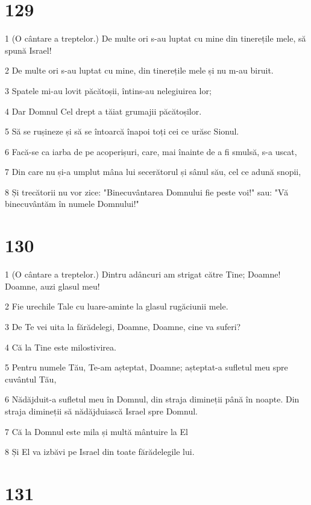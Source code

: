 \chapter{129}

\par 1 (O cântare a treptelor.) De multe ori s-au luptat cu mine din tinerețile mele, să spună Israel!
\par 2 De multe ori s-au luptat cu mine, din tinerețile mele și nu m-au biruit.
\par 3 Spatele mi-au lovit păcătoșii, întins-au nelegiuirea lor;
\par 4 Dar Domnul Cel drept a tăiat grumajii păcătoșilor.
\par 5 Să se rușineze și să se întoarcă înapoi toți cei ce urăsc Sionul.
\par 6 Facă-se ca iarba de pe acoperișuri, care, mai înainte de a fi smulsă, s-a uscat,
\par 7 Din care nu și-a umplut mâna lui secerătorul și sânul său, cel ce adună snopii,
\par 8 Și trecătorii nu vor zice: "Binecuvântarea Domnului fie peste voi!" sau: "Vă binecuvântăm în numele Domnului!"

\chapter{130}

\par 1 (O cântare a treptelor.) Dintru adâncuri am strigat către Tine; Doamne! Doamne, auzi glasul meu!
\par 2 Fie urechile Tale cu luare-aminte la glasul rugăciunii mele.
\par 3 De Te vei uita la fărădelegi, Doamne, Doamne, cine va suferi?
\par 4 Că la Tine este milostivirea.
\par 5 Pentru numele Tău, Te-am așteptat, Doamne; așteptat-a sufletul meu spre cuvântul Tău,
\par 6 Nădăjduit-a sufletul meu în Domnul, din straja dimineții până în noapte. Din straja dimineții să nădăjduiască Israel spre Domnul.
\par 7 Că la Domnul este mila și multă mântuire la El
\par 8 Și El va izbăvi pe Israel din toate fărădelegile lui.

\chapter{131}

